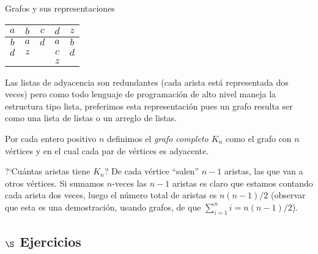 \begin{section}{Grafos y sus representaciones}

\begin{center}
\begin{tabular}{ccccc}
$a$&$b$&$c$&$d$&$z$ \\ \hline
$b$&$a$&$d$&$a$&$b$ \\
$d$&$z$&&$c$&$d$\\
&&&$z$&
\end{tabular}
\end{center}

Las listas de adyacencia son redundantes (cada arista está representada dos veces) pero como todo lenguaje de programación de alto nivel maneja la estructura tipo lista,  preferimos esta representación pues  un grafo  resulta ser como una lista de listas  o un  arreglo de listas.  


\begin{ejemplo}
Por cada entero positivo $n$ definimos el {\em grafo completo  
$K_n$} como el grafo con $n$ vértices y en el cual cada par de vértices es adyacente. 



?`Cuántas aristas tiene $K_n$? De cada vértice ``salen'' $n-1$ aristas, las que van a otros vértices. Si  sumamos $n$-veces las $n-1$ aristas es claro que estamos contando cada arista dos veces, luego el número total de aristas es $n(n-1)/2$ (observar que esta es una demostración, usando  grafos, de que $\sum_{i=1}^n i = n(n-1)/2$).



\end{ejemplo}
\subsection*{\Large $\S$ Ejercicios}


\end{section}
